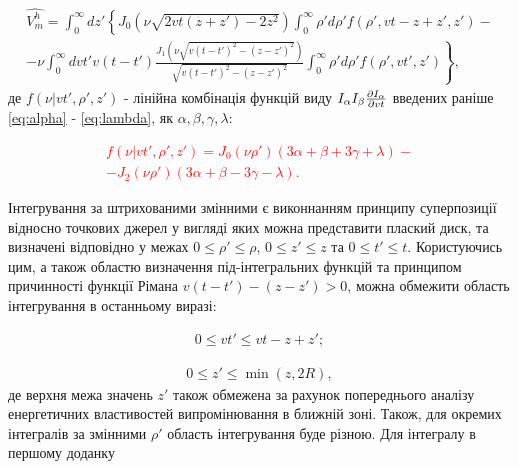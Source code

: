 \begin{equation} \begin{aligned}
\hat{V_m^h} = \int_{0}^{\infty} dz'
\left\{ J_0 \left( \nu \sqrt{2 vt (z + z') - 2 z^2} \right) 
\int_{0}^{\infty} \rho' d \rho'
f (\rho',vt - z + z',z') - \right. \\ 
\left. - \nu \int_{0}^{\infty} dvt' v (t-t') 
\frac{J_1 \left( \nu \sqrt{v(t-t')^2 - (z-z')^2} \right)}
{\sqrt{v(t-t')^2 - (z-z')^2}} 
\int_{0}^{\infty} \rho' d\rho'
f (\rho',vt',z')  \right\},
\end{aligned} \end{equation}
%
де $ f ( \nu | vt', \rho', z') $ - лінійна комбінація функцій виду
$ I_\alpha I_\beta \frac{\partial I_\alpha}{\partial vt} $ введених раніше 
\eqref{eq:alpha} - \eqref{eq:lambda}, як $ \alpha, \beta, \gamma, \lambda $:

\textcolor{red} { \begin{equation} \begin{aligned}
f ( \nu | vt', \rho', z') = 
J_0 (\nu \rho') (3 \alpha + \beta + 3 \gamma + \lambda) - \\
- J_2 (\nu \rho') (3 \alpha + \beta - 3 \gamma - \lambda).
\end{aligned} \end{equation} }

Інтегрування за штрихованими змінними є виконнанням принципу суперпозиції 
відносно точкових джерел у вигляді яких можна представити плаский диск, та
визначені відповідно у межах $ 0 \leq \rho' \leq \rho $,
$ 0 \leq z' \leq z $ та $ 0 \leq t' \leq t $. Користуючись цим, а також 
областю визначення під-інтегральних функцій та принципом причинності функції 
Рімана $ v(t-t')-(z-z') > 0 $, можна обмежити область інтегрування в 
останньому виразі:

\begin{equation} \begin{aligned}
0 \leq vt' \leq vt - z + z';
\end{aligned} \end{equation}

\begin{equation} \begin{aligned}
0 \leq z' \leq \min(z,2R),
\end{aligned} \end{equation}
%
де верхня межа значень $ z' $ також обмежена за рахунок попереднього аналізу 
енергетичних властивостей випромінювання в ближній зоні. Також, для окремих 
інтегралів за змінними $ \rho' $ область інтегрування буде різною. Для 
інтегралу в першому доданку

